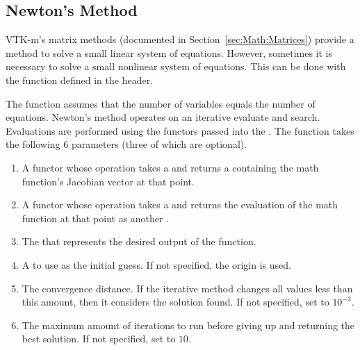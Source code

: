 
\subsection{Newton's Method}


VTK-m's matrix methods (documented in Section~\ref{sec:Math:Matrices})
provide a method to solve a small linear system of equations. However,
sometimes it is necessary to solve a small nonlinear system of equations.
This can be done with the  function defined in the
 header.


The  function assumes that the number of
variables equals the number of equations. Newton's method operates on an
iterative evaluate and search. Evaluations are performed using the functors
passed into the . The function takes the
following 6 parameters (three of which are optional).

\begin{enumerate}
\item A functor whose operation takes a  and returns a
   containing the math function's Jacobian vector at that
  point.
\item A functor whose operation takes a  and returns the
  evaluation of the math function at that point as another .
\item The  that represents the desired output of the function.
\item A  to use as the initial guess. If not specified, the
  origin is used.
\item The convergence distance. If the iterative method changes all
  values less than this amount, then it considers the solution found. If
  not specified, set to $10^{-3}$.
\item The maximum amount of iterations to run before giving up and
  returning the best solution. If not specified, set to $10$.
\end{enumerate}


